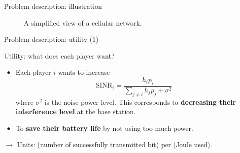 \begin{frame}{Problem description: illustration}
    \begin{figure}
        \centering
        \caption{A simplified view of a cellular network.}
    \end{figure}
\end{frame}

\begin{frame}{Problem description: utility (1)}
    \begin{exampleblock}{Utility: what does each player want?}
        \begin{itemize}
            \item Each player $i$ wants to increase
            \[ \text{SINR}_i = \frac{h_ip_i}{\sum_{j\neq i} h_jp_j + \sigma^2} \]
            where $\sigma^2$ is the noise power level. This corresponds to
            \textbf{decreasing their interference level} at the base station.
            \item To \textbf{save their battery life} by not using too much power.
        \end{itemize}
    \end{exampleblock}

    \vspace{0.5cm}
    $\to$ Units: (number of successfully transmitted bit) per (Joule used).
\end{frame}

